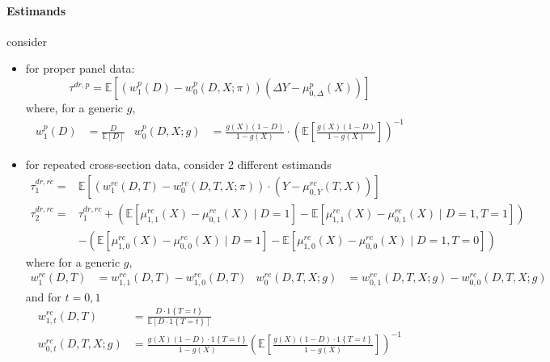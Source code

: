 \documentclass[twoside]{article}
\begin{document}
\paragraph*{Estimands} consider
\begin{itemize}
    \item for proper panel data: 
    \begin{equation*}
        \tau^{dr,p} = \mathbb{E}\left[ \left(w^p_1(D)-w^p_0\left(D,X;\pi\right)\right) \left(\Delta Y-\mu^p_{0,\Delta}(X)\right) \right]
    \end{equation*}
    where, for a generic $g$,
    \begin{align*}
        w^p_1(D) &= \frac{D}{\mathbb{E}\left[D\right]} & w^p_0\left(D,X;g\right)&= \frac{g(X)(1-D)}{1-g(X)}\cdot \left(\mathbb{E}\left[\frac{g(X)(1-D)}{1-g(X)}\right]\right)^{-1}
    \end{align*}
    \item for repeated cross-section data, consider 2 different estimands
    \begin{align*}
        \tau_1^{dr,rc} =& \mathbb{E}\left[\left(w^{rc}_1(D,T)-w_0^{rc}\left(D,T,X;\pi\right)\right) \cdot \left(Y-\mu^{rc}_{0,Y}(T,X)\right)\right] \\
        \tau^{dr,rc}_2 =& \tau^{dr,rc}_1 + \left(\mathbb{E}\left[\mu^{rc}_{1,1}(X)-\mu^{rc}_{0,1}(X)\mid D=1\right] -\mathbb{E}\left[\mu^{rc}_{1,1}(X)-\mu^{rc}_{0,1}(X)\mid D=1,T=1\right] \right)\\
        &- \left( \mathbb{E}\left[\mu^{rc}_{1,0}(X)-\mu^{rc}_{0,0}(X)\mid D=1\right] - \mathbb{E}\left[\mu^{rc}_{1,0}(X)-\mu^{rc}_{0,0}(X)\mid D=1,T=0\right] \right)
    \end{align*}
    where for a generic $g$,
    \begin{align*}
        w^{rc}_1(D,T)&=w^{rc}_{1,1}(D,T)-w^{rc}_{1,0}(D,T) & w^{rc}_0\left(D,T,X;g\right) &=w^{rc}_{0,1}\left(D,T,X;g\right) - w^{rc}_{0,0}\left(D,T,X;g\right) 
    \end{align*}
    and for $t=0,1$
    \begin{align*}
        w^{rc}_{1,t}\left(D,T\right) &= \frac{D\cdot 1\left\{T=t\right\}}{\mathbb{E} \left[D\cdot 1\left\{T=t\right\}\right]}\\
        w^{rc}_{0,t}\left(D,T,X;g\right) &= \frac{g(X)\left(1-D\right)\cdot 1\left\{T=t\right\}}{1-g(X)} \left(\mathbb{E}\left[\frac{g(X)\left(1-D\right)\cdot 1\left\{T=t\right\}}{1-g(X)}\right]\right)^{-1}
    \end{align*}
\end{itemize}
\end{document}
